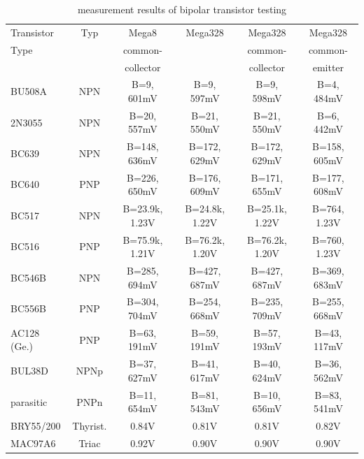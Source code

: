 \begin{table}[H]
  \begin{center}
    \begin{tabular}{| l | c | c | c | c | c |}
    \hline
 Transistor & Typ & Mega8           & Mega328        & Mega328         & Mega328 \\
    Type     &     & common-         &                & common-         & common- \\
            &     & collector      &                & collector       & emitter \\
    \hline
    \hline
BU508A      & NPN & B=9, 601mV      &  B=9, 597mV    &   B=9, 598mV    & B=4, 484mV \\
    \hline
2N3055      & NPN & B=20, 557mV     &  B=21, 550mV   &   B=21, 550mV   & B=6, 442mV \\
    \hline
BC639       & NPN & B=148, 636mV    &  B=172, 629mV  &   B=172, 629mV  & B=158, 605mV \\
    \hline
BC640       & PNP & B=226, 650mV    &  B=176, 609mV  &   B=171, 655mV  & B=177, 608mV \\
    \hline
BC517       & NPN & B=23.9k, 1.23V  &  B=24.8k, 1.22V&   B=25.1k, 1.22V & B=764, 1.23V \\
    \hline
BC516       & PNP & B=75.9k, 1.21V  &  B=76.2k, 1.20V&   B=76.2k, 1.20V & B=760, 1.23V \\
    \hline
BC546B      & NPN & B=285, 694mV    &  B=427, 687mV  &   B=427, 687mV   & B=369, 683mV \\
    \hline
BC556B      & PNP & B=304, 704mV    &  B=254, 668mV  &   B=235, 709mV   & B=255, 668mV \\
    \hline
AC128 (Ge.) & PNP & B=63, 191mV     &  B=59, 191mV   &   B=57, 193mV    & B=43, 117mV \\
    \hline
BUL38D      & NPNp & B=37, 627mV    &  B=41, 617mV  &   B=40, 624mV     & B=36, 562mV \\
parasitic   & PNPn & B=11, 654mV    &  B=81, 543mV  &   B=10, 656mV     & B=83, 541mV \\
    \hline
BRY55/200   & Thyrist. &  0.84V     &  0.81V         &   0.81V          &  0.82V \\
    \hline
MAC97A6     & Triac    &  0.92V     &  0.90V         &   0.90V          &  0.90V \\
    \hline
    \end{tabular}
  \end{center}
  \caption{measurement results of bipolar transistor testing}
  \label{tab:bipolar} 
\end{table}

